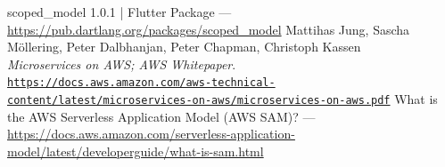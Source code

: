 \documentclass[10pt, a4paper]{article}
\begin{document}
\begin{thebibliography}{9}
scoped\_model 1.0.1 | Flutter Package --- \url{https://pub.dartlang.org/packages/scoped_model}
		Mattihas Jung, Sascha Möllering, Peter Dalbhanjan, Peter Chapman, Christoph Kassen \\
		\textit{Microservices on AWS; AWS Whitepaper}. \\
		\texttt{\url{https://docs.aws.amazon.com/aws-technical-content/latest/microservices-on-aws/microservices-on-aws.pdf}}
What is the AWS Serverless Application Model (AWS SAM)? --- \url{https://docs.aws.amazon.com/serverless-application-model/latest/developerguide/what-is-sam.html}
\end{thebibliography}

\begin{appendix}
	\listoffigures
\end{appendix}
\end{document}
